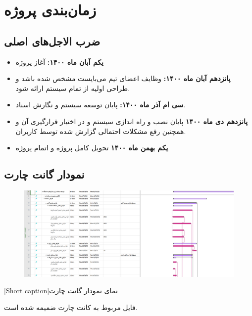 \section{
زمان‌بندی پروژه
}

\subsection*{
ضرب الاجل‌های اصلی
}

\begin{itemize}
	\item{
		\textbf{
یکم آبان ماه ۱۴۰۰:
		}
آغاز پروژه
	}
	\item{
	\textbf{پانزدهم آبان ماه ۱۴۰۰:}	
	وظایف اعضای تیم می‌بایست مشخص شده باشد و طراحی اولیه از تمام سیستم ارائه شود.
	}
	\item{
\textbf{سی ام آ‌ذر ماه ۱۴۰۰:}
پایان توسعه سیستم و نگارش اسناد.	
	}
	\item{
\textbf{ پانزدهم دی ماه ۱۴۰۰}	
پایان نصب و راه اندازی سیستم و در اختیار قرارگیری آن و همچنین رفع مشکلات احتمالی گزارش شده توسط کاربران.
	}
	\item{
\textbf{یکم بهمن ماه ۱۴۰۰}
تحویل کامل پروژه و اتمام پروژه	
	}
	
	
\end{itemize}

\subsection*{
نمودار گانت چارت
}

\begin{center}
  \begin{figure} [h!]
    { \includegraphics[width=\textwidth]{appandecies/gant_chart.png}}
  \end{figure}
  [Short caption]{نمای نمودار گانت چارت}
\end{center}

فایل مربوط به کانت چارت ضمیمه شده است.
